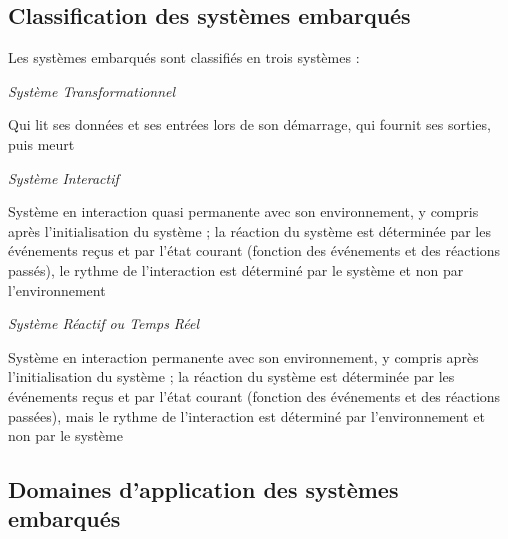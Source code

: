 \documentclass[12pt,a4paper]{report}
\begin{document}
\begin{flushleft}
	
	
	\noindent 
	
	\subsection{Classification des syst\`{e}mes embarqu\'{e}s}
	

\end{flushleft}


\noindent \begin{flushleft}
	Les syst\`{e}mes embarqu\'{e}s sont classifi\'{e}s en trois syst\`{e}mes :
	
	\noindent \textit{Syst\`{e}me Transformationnel}
	
	\noindent Qui lit ses donn\'{e}es et ses entr\'{e}es lors de son d\'{e}marrage, qui fournit ses sorties, puis meurt 
	
	\noindent \textit{Syst\`{e}me Interactif}
	
	\noindent Syst\`{e}me en interaction quasi permanente avec son environnement, y compris apr\`{e}s l'initialisation du syst\`{e}me ; la r\'{e}action du syst\`{e}me est d\'{e}termin\'{e}e par les \'{e}v\'{e}nements re\c{c}us et par l'\'{e}tat courant (fonction des \'{e}v\'{e}nements et des r\'{e}actions pass\'{e}s), le rythme de l'interaction est d\'{e}termin\'{e} par le syst\`{e}me et non par l'environnement 
	
	\noindent \textit{Syst\`{e}me R\'{e}actif ou Temps R\'{e}el}
	
	\noindent Syst\`{e}me en interaction permanente avec son environnement, y compris apr\`{e}s l'initialisation du syst\`{e}me ; la r\'{e}action du syst\`{e}me est d\'{e}termin\'{e}e par les \'{e}v\'{e}nements re\c{c}us et par l'\'{e}tat courant (fonction des \'{e}v\'{e}nements et des r\'{e}actions pass\'{e}es), mais le rythme de l'interaction est d\'{e}termin\'{e} par l'environnement et non par le syst\`{e}me 
	
	\noindent 
	
	\noindent 
	
	\subsection{Domaines d'application des syst\`{e}mes embarqu\'{e}s}
\end{flushleft}
\end{document}

